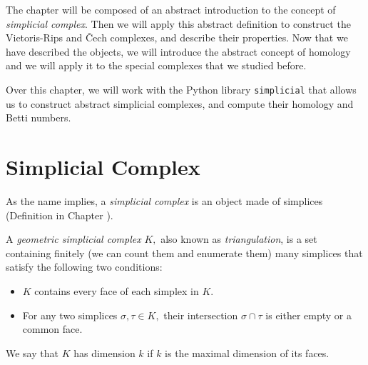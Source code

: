 \documentclass[
	fontsize=10pt, %
	twoside=false, %
	secnumdepth=1, %
]{kaobook}
\begin{document}
The chapter will be composed of an abstract introduction to the concept of \emph{simplicial complex}. Then we will apply this abstract definition to construct the Vietoris-Rips and \v{C}ech complexes, and describe their properties. Now that we have described the objects, we will introduce the abstract concept of homology and we will apply it to the special complexes that we studied before. 

Over this chapter, we will work with the Python library \texttt{simplicial} that allows us to construct abstract simplicial complexes, and compute their homology and Betti numbers. 

\section{Simplicial Complex}

As the name implies, a \emph{simplicial complex} is an object made of simplices (Definition in Chapter ).

\begin{definition}

\end{definition}


\begin{definition}
A \emph{geometric simplicial complex} $K,$ also known as \emph{triangulation}, is a set containing finitely (we can count them and enumerate them) many simplices that satisfy the following two conditions:
\begin{itemize}
\item $K$ contains every face of each simplex in $K.$
\item For any two simplices $\sigma,\tau\in K,$ their intersection $\sigma\cap \tau$ is either empty or a common face.
\end{itemize}

We say that $K$ has dimension $k$ if $k$ is the maximal dimension of its faces.
\end{definition}
\end{document}
